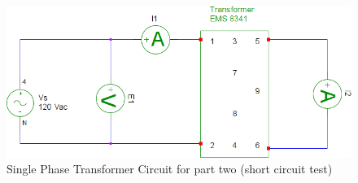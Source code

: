 \documentclass{article}
\begin{document}
\begin{figure}[H]
  \centering
  \includegraphics[width=.8\textwidth]{img/circuit_03}
  \caption{Single Phase Transformer Circuit for part two (short circuit test)}
  \label{fig:circuit_03}
\end{figure}
\end{document}
